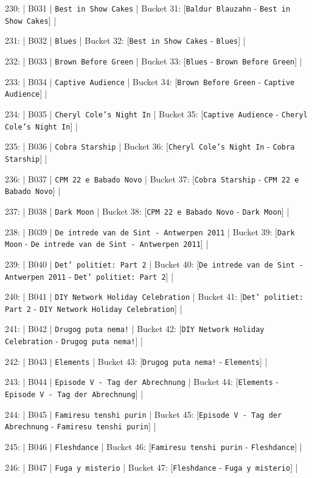 \documentclass[11pt,a4paper]{article}
\begin{document}
230: | B031 | \texttt{Best in Show Cakes} | Bucket 31: [\texttt{Baldur Blauzahn} - \texttt{Best in Show Cakes}] |

231: | B032 | \texttt{Blues} | Bucket 32: [\texttt{Best in Show Cakes} - \texttt{Blues}] |

232: | B033 | \texttt{Brown Before Green} | Bucket 33: [\texttt{Blues} - \texttt{Brown Before Green}] |

233: | B034 | \texttt{Captive Audience} | Bucket 34: [\texttt{Brown Before Green} - \texttt{Captive Audience}] |

234: | B035 | \texttt{Cheryl Cole's Night In} | Bucket 35: [\texttt{Captive Audience} - \texttt{Cheryl Cole's Night In}] |

235: | B036 | \texttt{Cobra Starship} | Bucket 36: [\texttt{Cheryl Cole's Night In} - \texttt{Cobra Starship}] |

236: | B037 | \texttt{CPM 22 e Babado Novo} | Bucket 37: [\texttt{Cobra Starship} - \texttt{CPM 22 e Babado Novo}] |

237: | B038 | \texttt{Dark Moon} | Bucket 38: [\texttt{CPM 22 e Babado Novo} - \texttt{Dark Moon}] |

238: | B039 | \texttt{De intrede van de Sint - Antwerpen 2011} | Bucket 39: [\texttt{Dark Moon} - \texttt{De intrede van de Sint - Antwerpen 2011}] |

239: | B040 | \texttt{Det' politiet: Part 2} | Bucket 40: [\texttt{De intrede van de Sint - Antwerpen 2011} - \texttt{Det' politiet: Part 2}] |

240: | B041 | \texttt{DIY Network Holiday Celebration} | Bucket 41: [\texttt{Det' politiet: Part 2} - \texttt{DIY Network Holiday Celebration}] |

241: | B042 | \texttt{Drugog puta nema!} | Bucket 42: [\texttt{DIY Network Holiday Celebration} - \texttt{Drugog puta nema!}] |

242: | B043 | \texttt{Elements} | Bucket 43: [\texttt{Drugog puta nema!} - \texttt{Elements}] |

243: | B044 | \texttt{Episode V - Tag der Abrechnung} | Bucket 44: [\texttt{Elements} - \texttt{Episode V - Tag der Abrechnung}] |

244: | B045 | \texttt{Famiresu tenshi purin} | Bucket 45: [\texttt{Episode V - Tag der Abrechnung} - \texttt{Famiresu tenshi purin}] |

245: | B046 | \texttt{Fleshdance} | Bucket 46: [\texttt{Famiresu tenshi purin} - \texttt{Fleshdance}] |

246: | B047 | \texttt{Fuga y misterio} | Bucket 47: [\texttt{Fleshdance} - \texttt{Fuga y misterio}] |
\end{document}
